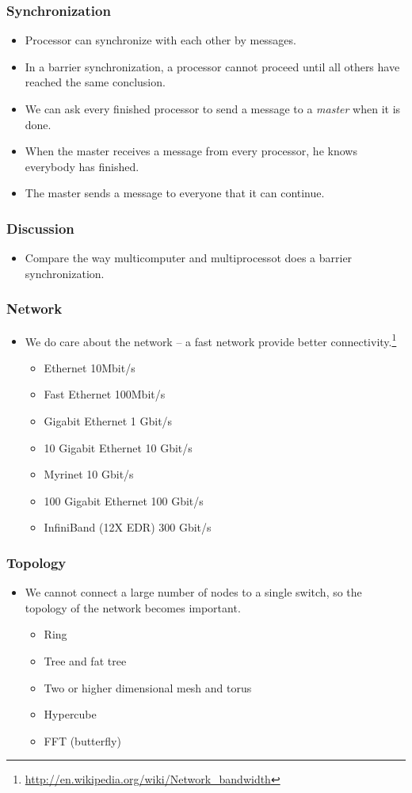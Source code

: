 \documentclass{beamer}
\begin{document}
\begin{CJK}{UTF8}{bsmi}
\begin{frame}
\frametitle{Synchronization}
\begin{itemize}
\item Processor can synchronize with each other by messages.
\item In a barrier synchronization, a processor cannot proceed until
  all others have reached the same conclusion.
\item We can ask every finished processor to send a message to a {\em
  master} when it is done.
\item When the master receives a message from every processor, he
  knows everybody has finished.
\item The master sends a message to everyone that it can continue.
\end{itemize}
\end{frame}

\begin{frame}
\frametitle{Discussion}
\begin{itemize}
\item Compare the way multicomputer and multiprocessot does a barrier
 synchronization.
\end{itemize}
\end{frame}



\begin{frame}
\frametitle{Network}
\begin{itemize}
\item We do care about the network -- a fast network provide better
  connectivity.\footnote{\url{http://en.wikipedia.org/wiki/Network_bandwidth}}
\begin{itemize}
\item Ethernet 10Mbit/s
\item Fast Ethernet 100Mbit/s
\item Gigabit Ethernet 1 Gbit/s
\item 10 Gigabit Ethernet 10  Gbit/s
\item Myrinet 10 Gbit/s
\item 100 Gigabit Ethernet 100 Gbit/s
\item InfiniBand (12X EDR) 300 Gbit/s
\end{itemize}

\end{itemize}
\end{frame}

\begin{frame}
\frametitle{Topology}
\begin{itemize}
\item We cannot connect a large number of nodes to a single switch, so
  the topology of the network becomes important.
\begin{itemize}
\item Ring
\item Tree and fat tree
\item Two or higher dimensional mesh and torus
\item Hypercube
\item FFT (butterfly)
\end{itemize}
\end{itemize}
\end{frame}


\end{CJK}
\end{document}
